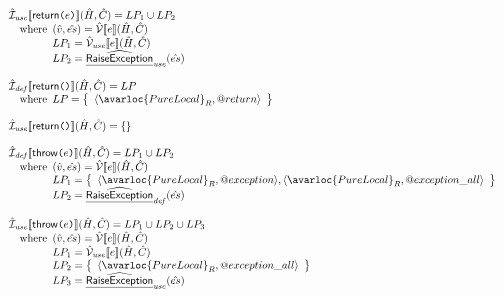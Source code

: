 \[\begin{array}{l}
{  }
  \\\\
  \aI_{\it use}\lbr \SF{return}\TT{(}e\TT{)} \rbr(\hat{H},\hat{C})
  = LP_1 \cup LP_2\\
  \quad\wherec{
    (\hat{v},\hat{es})=\aV\lbr e\rbr(\hat{H},\hat{C})\\
    LP_1 = \aV_{\it use}\lbr e\rbr(\hat{H},\hat{C})\\
    LP_2 = \ahf{RaiseException}_{\it use}(\hat{es})\\
  }
  \\\\
  \aI_{\it def}\lbr \SF{return}\TT{()} \rbr(\hat{H},\hat{C})
  = LP\\
  \quad\wherec{
    LP = \set{\langle\avarloc{PureLocal}_R,\varprop{return}\rangle}
  }
  \\\\
  \aI_{\it use}\lbr \SF{return}\TT{()} \rbr(\hat{H},\hat{C})
  = \set{}
  \\\\
  \aI_{\it def}\lbr \SF{throw}\TT{(}e\TT{)} \rbr(\hat{H},\hat{C})
  = LP_1 \cup LP_2\\
  \quad\wherec{
    (\hat{v},\hat{es})=\aV\lbr e\rbr(\hat{H},\hat{C})\\
    LP_1 = \set{\langle\avarloc{PureLocal}_R,\varprop{exception}\rangle,
      \langle\avarloc{PureLocal}_R,\varprop{exception\_all}\rangle}\\
    LP_2 = \ahf{RaiseException}_{\it def}(\hat{es})\\
  }
  \\\\
  \aI_{\it use}\lbr \SF{throw}\TT{(}e\TT{)} \rbr(\hat{H},\hat{C})
  = LP_1\cup LP_2 \cup LP_3\\
  \quad\wherec{
    (\hat{v},\hat{es})=\aV\lbr e\rbr(\hat{H},\hat{C})\\
    LP_1 = \aV_{\it use}\lbr e\rbr(\hat{H},\hat{C})\\
    LP_2 = \set{\langle\avarloc{PureLocal}_R,\varprop{exception\_all}\rangle}\\
    LP_3 = \ahf{RaiseException}_{\it use}(\hat{es})\\
  }
  \\\\
\end{array}
\]
